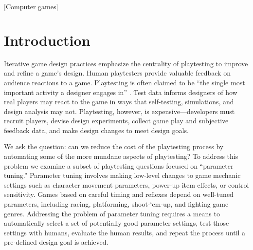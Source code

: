 \documentclass{sig-alternate}
\begin{document}
[Computer games]



\section{Introduction}



Iterative game design practices emphasize the centrality of playtesting to improve and refine a game's design.
Human playtesters provide valuable feedback on audience reactions to a game.
Playtesting is often claimed to be ``the single most important activity a designer engages in'' \cite{fullerton2008:playcentric}.
Test data informs designers of how real players may react to the game in ways that self-testing, simulations, and design analysis may not.
Playtesting, however, is expensive---developers must recruit players, devise design experiments, collect game play and subjective feedback data, and make design changes to meet design goals.


We ask the question: can we reduce the cost of the playtesting process by automating some of the more mundane aspects of playtesting?
To address this problem we examine a subset of playtesting questions focused on ``parameter tuning.''
Parameter tuning involves making low-level changes to game mechanic settings such as character movement parameters, power-up item effects, or control sensitivity.
Games based on careful timing and reflexes depend on well-tuned parameters, including racing, platforming, shoot-`em-up, and fighting game genres.
Addressing the problem of parameter tuning requires a means to automatically select a set of potentially good parameter settings, test those settings with humans, evaluate the human results, and repeat the process until a pre-defined design goal is achieved.
\end{document}
